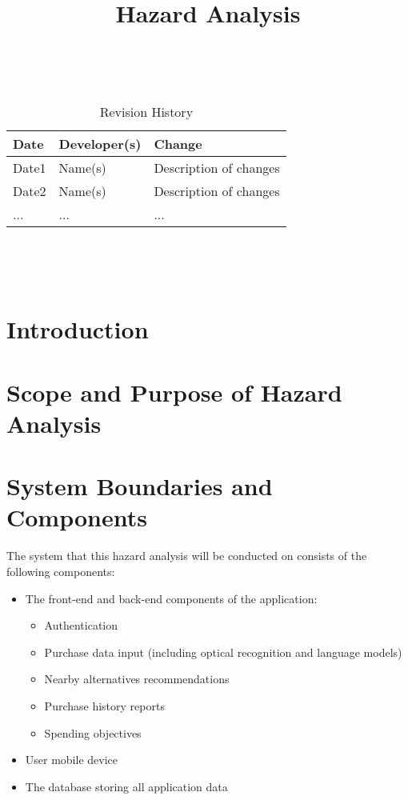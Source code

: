 \documentclass{article}
\title{Hazard Analysis\\\progname}
\author{\authname}
\date{}
\begin{document}
\maketitle
\thispagestyle{empty}

~\newpage


\begin{table}[hp]
\caption{Revision History} \label{TblRevisionHistory}
\begin{tabularx}{\textwidth}{llX}
\toprule
\textbf{Date} & \textbf{Developer(s)} & \textbf{Change}\\
\midrule
Date1 & Name(s) & Description of changes\\
Date2 & Name(s) & Description of changes\\
... & ... & ...\\
\bottomrule
\end{tabularx}
\end{table}

~\newpage

\tableofcontents

~\newpage



\section{Introduction}


\section{Scope and Purpose of Hazard Analysis}

\section{System Boundaries and Components}
The system that this hazard analysis will be conducted on consists of the following components:
\begin{itemize}
    \item The front-end and back-end components of the application:
        \begin{itemize}
            \item Authentication
            \item Purchase data input (including optical recognition and language models)
            \item Nearby alternatives recommendations
            \item Purchase history reports
            \item Spending objectives
        \end{itemize}
    \item User mobile device
    \item The database storing all application data
\end{itemize}
\end{document}

